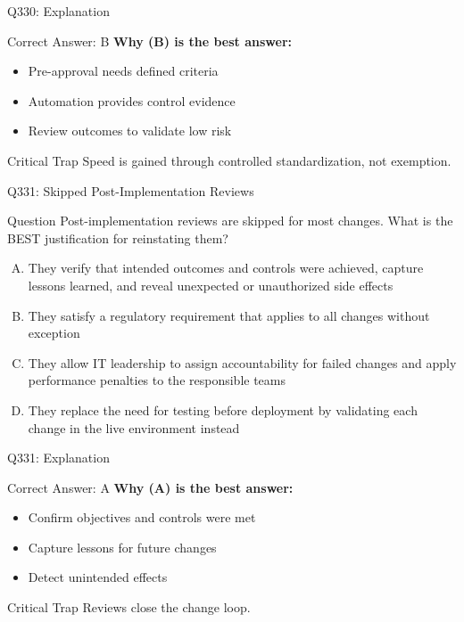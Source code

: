 \documentclass{beamer}
\begin{document}
	\begin{frame}{Q330: Explanation}
		\begin{block}{Correct Answer: B}
			\textbf{Why (B) is the best answer:}
			\begin{itemize}
				\item Pre-approval needs defined criteria
				\item Automation provides control evidence
				\item Review outcomes to validate low risk
			\end{itemize}
		\end{block}
		\begin{alertblock}{Critical Trap}
			Speed is gained through controlled standardization, not exemption.
		\end{alertblock}
	\end{frame}
	
	\begin{frame}{Q331: Skipped Post-Implementation Reviews}
		\begin{block}{Question}
			\small Post-implementation reviews are skipped for most changes. What is the BEST justification for reinstating them?
		\end{block}
		\begin{enumerate}[(A)]
			\footnotesize
			\item They verify that intended outcomes and controls were achieved, capture lessons learned, and reveal unexpected or unauthorized side effects
			\item They satisfy a regulatory requirement that applies to all changes without exception
			\item They allow IT leadership to assign accountability for failed changes and apply performance penalties to the responsible teams
			\item They replace the need for testing before deployment by validating each change in the live environment instead
		\end{enumerate}
	\end{frame}
	
	\begin{frame}{Q331: Explanation}
		\begin{block}{Correct Answer: A}
			\textbf{Why (A) is the best answer:}
			\begin{itemize}
				\item Confirm objectives and controls were met
				\item Capture lessons for future changes
				\item Detect unintended effects
			\end{itemize}
		\end{block}
		\begin{alertblock}{Critical Trap}
			Reviews close the change loop.
		\end{alertblock}
	\end{frame}
	
\end{document}

